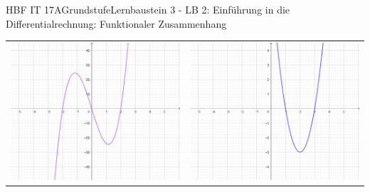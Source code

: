 \documentclass[oneside,openany,headings=optiontotoc,11pt,numbers=noenddot]{scrreprt}
\begin{document}
\begin{worksheet}{HBF IT 17A}{Grundstufe}{Lernbaustein 3 - LB 2: Einführung in die Differentialrechnung: Funktionaler Zusammenhang}
\begin{framed}
\begin{tabularx}{\textwidth}{X|X}
				\includegraphics[scale=0.3]{Bilder/fktZusammenhf'.jpg} & \includegraphics[scale=0.3]{Bilder/fktZusammenhg'.jpg}\\

\end{tabularx}
\end{framed}
\end{worksheet}
\end{document}
